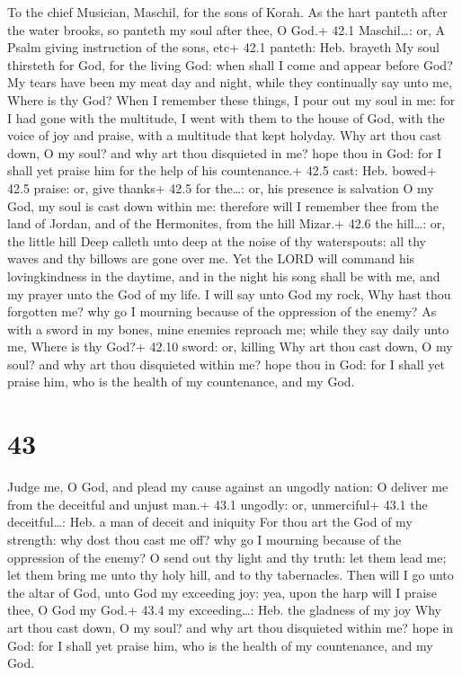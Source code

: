 To the chief Musician, Maschil, for the sons of Korah.  As
the hart panteth after the water brooks, so panteth my soul after thee,
O God.+ 42.1 Maschil\ldots: or, A Psalm giving instruction of the sons,
etc+ 42.1 panteth: Heb. brayeth  My soul thirsteth for God,
for the living God: when shall I come and appear before God?
 My tears have been my meat day and night, while they
continually say unto me, Where is thy God?  When I remember
these things, I pour out my soul in me: for I had gone with the
multitude, I went with them to the house of God, with the voice of joy
and praise, with a multitude that kept holyday.  Why art
thou cast down, O my soul? and why art thou disquieted in me? hope thou
in God: for I shall yet praise him for the help of his countenance.+
42.5 cast: Heb. bowed+ 42.5 praise: or, give thanks+ 42.5 for the\ldots:
or, his presence is salvation  O my God, my soul is cast
down within me: therefore will I remember thee from the land of Jordan,
and of the Hermonites, from the hill Mizar.+ 42.6 the hill\ldots: or,
the little hill  Deep calleth unto deep at the noise of thy
waterspouts: all thy waves and thy billows are gone over me.
 Yet the LORD will command his lovingkindness in the
daytime, and in the night his song shall be with me, and my prayer unto
the God of my life.  I will say unto God my rock, Why hast
thou forgotten me? why go I mourning because of the oppression of the
enemy?  As with a sword in my bones, mine enemies reproach
me; while they say daily unto me, Where is thy God?+ 42.10 sword: or,
killing  Why art thou cast down, O my soul? and why art
thou disquieted within me? hope thou in God: for I shall yet praise him,
who is the health of my countenance, and my God.

\hypertarget{section-42}{%
\section{43}\label{section-42}}

 Judge me, O God, and plead my cause against an ungodly
nation: O deliver me from the deceitful and unjust man.+ 43.1 ungodly:
or, unmerciful+ 43.1 the deceitful\ldots: Heb. a man of deceit and
iniquity  For thou art the God of my strength: why dost thou
cast me off? why go I mourning because of the oppression of the enemy?
 O send out thy light and thy truth: let them lead me; let
them bring me unto thy holy hill, and to thy tabernacles. 
Then will I go unto the altar of God, unto God my exceeding joy: yea,
upon the harp will I praise thee, O God my God.+ 43.4 my
exceeding\ldots: Heb. the gladness of my joy  Why art thou
cast down, O my soul? and why art thou disquieted within me? hope in
God: for I shall yet praise him, who is the health of my countenance,
and my God.

